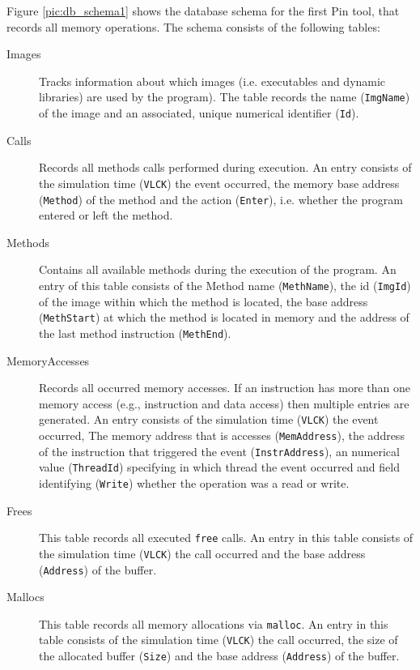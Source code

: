 Figure \ref{pic:db_schema1} shows the database schema for the first
Pin tool, that records all memory operations. The schema consists of
the following tables:
\begin{description}
  \item[Images] Tracks information about which images
    (i.e. executables and dynamic libraries) are used by the
    program). The table records the name (\texttt{ImgName}) of the
    image and an associated, unique numerical identifier
    (\texttt{Id}).
  \item[Calls] Records all methods calls performed during
    execution. An entry consists of the simulation time
    (\texttt{VLCK}) the event occurred, the memory base address
    (\texttt{Method}) of the method and the action (\texttt{Enter}),
    i.e. whether the program entered or left the method.
  \item[Methods] Contains all available methods during the execution
    of the program. An entry of this table consists of the Method name
    (\texttt{MethName}), the id (\texttt{ImgId}) of the image within
    which the method is located, the base address (\texttt{MethStart})
    at which the method is located in memory and the address of the
    last method instruction (\texttt{MethEnd}).
  \item[MemoryAccesses] Records all occurred memory accesses. If an
    instruction has more than one memory access (e.g., instruction and
    data access) then multiple entries are generated. An entry
    consists of the simulation time (\texttt{VLCK}) the event
    occurred, The memory address that is accesses
    (\texttt{MemAddress}), the address of the instruction that
    triggered the event (\texttt{InstrAddress}), an numerical value
    (\texttt{ThreadId}) specifying in which thread the event occurred
    and field identifying (\texttt{Write}) whether the operation was a
    read or write.
  \item[Frees] This table records all executed \texttt{free} calls. An
    entry in this table consists of the simulation time
    (\texttt{VLCK}) the call occurred and the base address
    (\texttt{Address}) of the buffer.
  \item[Mallocs] This table records all memory allocations via
    \texttt{malloc}. An entry in this table consists of the simulation
    time (\texttt{VLCK}) the call occurred, the size of the allocated
    buffer (\texttt{Size}) and the base address (\texttt{Address}) of
    the buffer.
\end{description}


